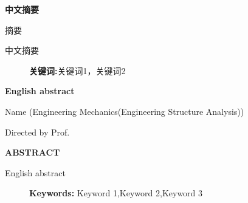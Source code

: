 \begin{center}
    \thispagestyle{empty}
    \fontsize{18pt}{\baselineskip}\bf\textsf{中文摘要}
    \vspace{10pt}
    
    \textsf{摘\quad 要}
\end{center}

\vspace{10pt}

中文摘要

\begin{figure}[b]
    \textbf{关键词:}关键词1，关键词2
\end{figure}

\newpage

\begin{center}
    \thispagestyle{empty}
    \fontsize{18pt}{\baselineskip}\textbf{English abstract}
    \vspace{10pt}

    Name (Engineering Mechanics(Engineering Structure Analysis))

    Directed by Prof. 

    \vspace{10pt}

    \bf
    ABSTRACT
\end{center}

\vspace{10pt}
\setlength{\parindent}{0em}

English abstract


\begin{figure}[b]
    \textbf{Keywords:} Keyword 1,\quad Keyword 2,\quad Keyword 3
\end{figure}

\setlength{\parindent}{2em}